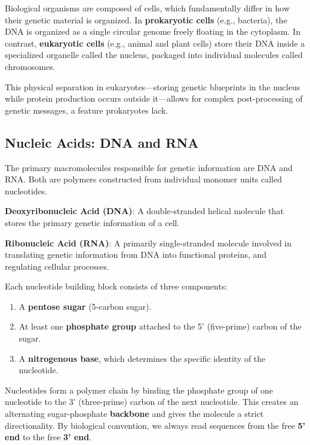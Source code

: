 \documentclass[11pt, a4paper]{article}
\begin{document}
Biological organisms are composed of cells, which fundamentally differ in how their genetic material is organized. In \textbf{prokaryotic cells} (e.g., bacteria), the DNA is organized as a single circular genome freely floating in the cytoplasm. In contrast, \textbf{eukaryotic cells} (e.g., animal and plant cells) store their DNA inside a specialized organelle called the nucleus, packaged into individual molecules called chromosomes.

This physical separation in eukaryotes—storing genetic blueprints in the nucleus while protein production occurs outside it—allows for complex post-processing of genetic messages, a feature prokaryotes lack. 

\subsection{Nucleic Acids: DNA and RNA}

The primary macromolecules responsible for genetic information are DNA and RNA. Both are polymers constructed from individual monomer units called nucleotides.

\begin{important}
    \textbf{Deoxyribonucleic Acid (DNA)}: A double-stranded helical molecule that stores the primary genetic information of a cell. 
    
    \textbf{Ribonucleic Acid (RNA)}: A primarily single-stranded molecule involved in translating genetic information from DNA into functional proteins, and regulating cellular processes.
\end{important}


Each nucleotide building block consists of three components:
\begin{enumerate}
    \item A \textbf{pentose sugar} (5-carbon sugar).
    \item At least one \textbf{phosphate group} attached to the 5' (five-prime) carbon of the sugar.
    \item A \textbf{nitrogenous base}, which determines the specific identity of the nucleotide.
\end{enumerate}

Nucleotides form a polymer chain by binding the phosphate group of one nucleotide to the 3' (three-prime) carbon of the next nucleotide. This creates an alternating sugar-phosphate \textbf{backbone} and gives the molecule a strict directionality. By biological convention, we always read sequences from the free \textbf{5' end} to the free \textbf{3' end}.
\end{document}
